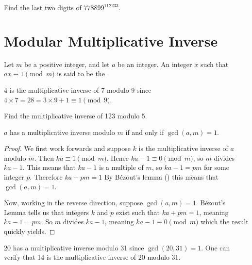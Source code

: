 \begin{exercise}
    Find the last two digits of $778899^{112233}$.
\end{exercise}

\newpage

\section{Modular Multiplicative Inverse}
\begin{definition}
    Let $m$ be a positive integer, and let $a$ be an integer. An integer $x$ such that $ax \equiv 1 \pmod m$ is said to be the .
\end{definition}

\begin{example}
    4 is the multiplicative inverse of 7 modulo 9 since $4 \times 7 = 28 = 3 \times 9 + 1 \equiv 1 \pmod 9$.
\end{example}

\begin{exercise}
    Find the multiplicative inverse of 123 modulo 5.
\end{exercise}

\begin{proposition}\label{prop-multiplicative-inverse-exists-iff-coprime}
    $a$ has a multiplicative inverse modulo $m$ if and only if $\gcd(a,m) = 1$.
\end{proposition}
\begin{proof}
    We first work forwards and suppose $k$ is the multiplicative inverse of $a$ modulo $m$. Then $ka \equiv 1 \pmod m$. Hence $ka - 1 \equiv 0 \pmod m$, so $m$ divides $ka - 1$. This means that $ka - 1$ is a multiple of $m$, so $ka - 1 = pm$ for some integer $p$. Therefore $ka + pm = 1$ By B\'{e}zout's lemma () this means that $\gcd(a, m) = 1$.

    Now, working in the reverse direction, suppose $\gcd(a, m) = 1$. B\'{e}zout's Lemma tells us that integers $k$ and $p$ exist such that $ka + pm = 1$, meaning $ka - 1 = pm$. So $m$ divides $ka - 1$, meaning $ka - 1 \equiv 0 \pmod m$ which the result quickly yields.
\end{proof}

\begin{example}
    20 has a multiplicative inverse modulo 31 since $\gcd(20, 31) = 1$. One can verify that 14 is the multiplicative inverse of 20 modulo 31.
\end{example}

